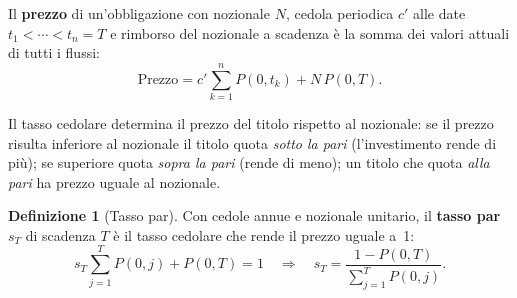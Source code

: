 \documentclass[11pt,a4paper]{article}
\theoremstyle{plain}
\theoremstyle{definition}
\newtheorem{definizione}[teorema]{Definizione}
\theoremstyle{remark}
\begin{document}
Il \textbf{prezzo} di un'obbligazione con nozionale $N$, cedola periodica $c'$ alle
date $t_1 < \cdots < t_n = T$ e rimborso del nozionale a scadenza \`e la somma dei valori
attuali di tutti i flussi:
\begin{equation}
  \text{Prezzo} = c' \sum_{k=1}^{n} P(0,t_k) + N\,P(0,T).
  \label{eq:prezzo-bond}
\end{equation}

Il tasso cedolare determina il prezzo del titolo rispetto al nozionale: se il prezzo risulta
inferiore al nozionale il titolo quota \emph{sotto la pari} (l'investimento rende di pi\`u); se
superiore quota \emph{sopra la pari} (rende di meno); un titolo che quota \emph{alla pari} ha
prezzo uguale al nozionale.
\begin{definizione}[Tasso par]
\label{def:par}
Con cedole annue e nozionale unitario, il \textbf{tasso par} $s_T$ di scadenza $T$ \`e
il tasso cedolare che rende il prezzo uguale a~1:
\begin{equation}
  \label{eq:tasso_par}
  s_T \sum_{j=1}^{T} P(0,j) + P(0,T) = 1
  \quad\Longrightarrow\quad
  s_T = \frac{1 - P(0,T)}{\displaystyle\sum_{j=1}^{T} P(0,j)}.
\end{equation}
\end{definizione}
\end{document}
